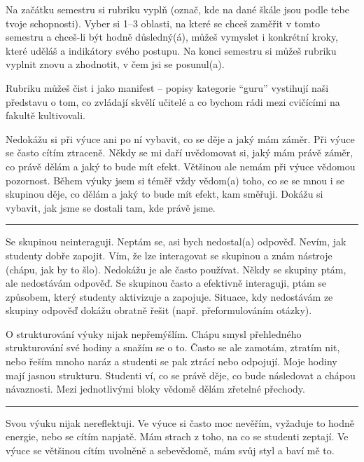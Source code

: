 Na začátku semestru si rubriku vyplň (označ, kde na dané škále jsou podle tebe tvoje schopnosti). Vyber si 1--3 oblasti, na které se chceš zaměřit v tomto semestru a chceš-li být hodně důsledný(á), můžeš vymyslet i konkrétní kroky, které uděláš a indikátory svého postupu. Na konci semestru si můžeš rubriku vyplnit znovu a zhodnotit, v čem jsi se posunul(a).

Rubriku můžeš čist i jako manifest -- popisy kategorie \enquote{guru} vystihují naši představu o tom, co zvládají skvělí učitelé a co bychom rádi mezi cvičícími na fakultě kultivovali.


\newpage
{}
{Nedokážu si při výuce ani po ní vybavit, co se děje a jaký mám záměr. Při výuce se často cítím ztraceně.}
{Někdy se mi daří uvědomovat si, jaký mám právě záměr, co právě dělám a jaký to bude mít efekt. Většinou ale nemám při výuce vědomou pozornost.}
{Během výuky jsem si téměř vždy vědom(a) toho, co se se mnou i se skupinou děje, co dělám a jaký to bude mít efekt, kam směřuji. Dokážu si vybavit, jak jsme se dostali tam, kde právě jsme.}

\rule{\textwidth}{0.4pt}
{Se skupinou neinteraguji. Neptám se, asi bych nedostal(a) odpověď. Nevím, jak studenty dobře zapojit.}
{Vím, že lze interagovat se skupinou a znám nástroje (chápu, jak by to šlo). Nedokážu je ale často používat. Někdy  se skupiny ptám, ale nedostávám odpověď.}
{Se skupinou často a efektivně interaguji, ptám se způsobem, který studenty aktivizuje a zapojuje. Situace, kdy nedostávám ze skupiny odpověď dokážu obratně řešit (např. přeformulováním otázky).}

\newpage
{}
{O strukturování výuky nijak nepřemýšlím.}
{Chápu smysl přehledného strukturování své hodiny a snažím se o to. Často se ale zamotám, ztratím nit, nebo řeším mnoho naráz a studenti se pak ztrácí nebo odpojují.}
{Moje hodiny mají jasnou strukturu. Studenti ví, co se právě děje, co bude následovat a chápou návaznosti. Mezi jednotlivými bloky vědomě dělám zřetelné přechody.}

\rule{\textwidth}{0.4pt}
{Svou výuku nijak nereflektuji.}
{Ve výuce si často moc nevěřím, vyžaduje to hodně energie, nebo se cítím napjatě. Mám strach z toho, na co se studenti zeptají.}
{Ve výuce se většinou cítím uvolněně a sebevědomě, mám svůj styl a baví mě to.}

